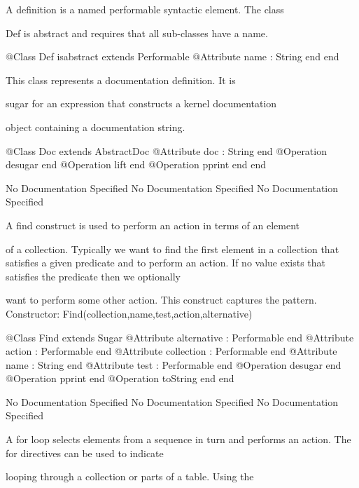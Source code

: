       A definition is a named performable syntactic element. The class

      Def is abstract and requires that all sub-classes have a name.
\begin{Interface}
@Class Def isabstract extends Performable
  @Attribute name : String end
end
\end{Interface}

      This class represents a documentation definition. It is

      sugar for an expression that constructs a kernel documentation

      object containing a documentation string.
\begin{Interface}
@Class Doc extends AbstractDoc
  @Attribute doc : String end
  @Operation desugar end
  @Operation lift end
  @Operation pprint end
end
\end{Interface}
No Documentation Specified
No Documentation Specified
No Documentation Specified

      A find construct is used to perform an action in terms of an element

      of a collection. Typically we want to find the first element in a 
      collection that satisfies a given predicate and to perform an action.
      If no value exists that satisfies the predicate then we optionally

      want to perform some other action. This construct captures the pattern.
      Constructor: Find(collection,name,test,action,alternative)
\begin{Interface}
@Class Find extends Sugar
  @Attribute alternative : Performable end
  @Attribute action : Performable end
  @Attribute collection : Performable end
  @Attribute name : String end
  @Attribute test : Performable end
  @Operation desugar end
  @Operation pprint end
  @Operation toString end
end
\end{Interface}
No Documentation Specified
No Documentation Specified
No Documentation Specified

      A for loop selects elements from a sequence in turn and 
      performs an action. The for directives can be used to indicate

      looping through a collection or parts of a table. Using the

